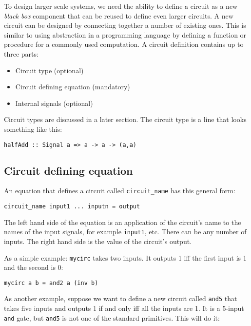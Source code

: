 \documentclass[11pt]{article}
\begin{document}
To design larger scale systems, we need the ability to define a
circuit as a new \emph{black box} component that can be reused to define
even larger circuits.  A new circuit can be designed by connecting
together a number of existing ones.  This is similar to using
abstraction in a programming language by defining a function or
procedure for a commonly used computation.  A circuit definition
contains up to three parts:

\begin{itemize}
\item Circuit type (optional)
\item Circuit defining equation (mandatory)
\item Internal signals (optional)
\end{itemize}

Circuit types are discussed in a later section.  The circuit type is a
line that looks something like this:

\begin{verbatim}
halfAdd :: Signal a => a -> a -> (a,a)
\end{verbatim}

\subsection{Circuit defining equation}
\label{sec:org8f925c8}

An equation that defines a circuit called \texttt{circuit\_name} has this
general form:

\begin{verbatim}
circuit_name input1 ... inputn = output
\end{verbatim}

The left hand side of the equation is an application of the circuit's
name to the names of the input signals, for example \texttt{input1}, etc.
There can be any number of inputs.  The right hand side is the value
of the circuit's output.

As a simple example: \texttt{mycirc} takes two inputs.  It outputs 1 iff the
first input is 1 and the second is 0:

\begin{verbatim}
mycirc a b = and2 a (inv b)
\end{verbatim}

As another example, suppose we want to define a new circuit called
\texttt{and5} that takes five inputs and outputs 1 if and only iff all the
inputs are 1.  It is a 5-input \texttt{and} gate, but \texttt{and5} is not one of
the standard primitives.  This will do it:
\end{document}
